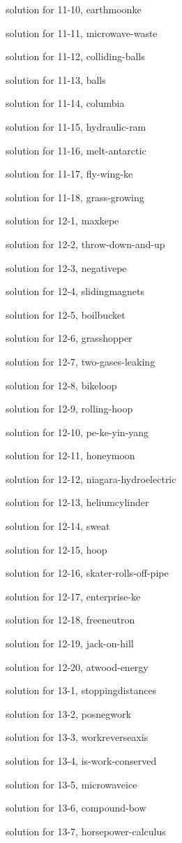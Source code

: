 \documentclass{problems}
\begin{document}
solution for 11-10, earthmoonke

solution for 11-11, microwave-waste

solution for 11-12, colliding-balls

solution for 11-13, balls

solution for 11-14, columbia

solution for 11-15, hydraulic-ram

solution for 11-16, melt-antarctic

solution for 11-17, fly-wing-ke

solution for 11-18, grass-growing

solution for 12-1, maxkepe

solution for 12-2, throw-down-and-up

solution for 12-3, negativepe

solution for 12-4, slidingmagnets

solution for 12-5, boilbucket

solution for 12-6, grasshopper

solution for 12-7, two-gases-leaking

solution for 12-8, bikeloop

solution for 12-9, rolling-hoop

solution for 12-10, pe-ke-yin-yang

solution for 12-11, honeymoon

solution for 12-12, niagara-hydroelectric

solution for 12-13, heliumcylinder

solution for 12-14, sweat

solution for 12-15, hoop

solution for 12-16, skater-rolls-off-pipe

solution for 12-17, enterprise-ke

solution for 12-18, freeneutron

solution for 12-19, jack-on-hill

solution for 12-20, atwood-energy

solution for 13-1, stoppingdistances

solution for 13-2, posnegwork

solution for 13-3, workreverseaxis

solution for 13-4, is-work-conserved

solution for 13-5, microwaveice

solution for 13-6, compound-bow

solution for 13-7, horsepower-calculus
\end{document}
